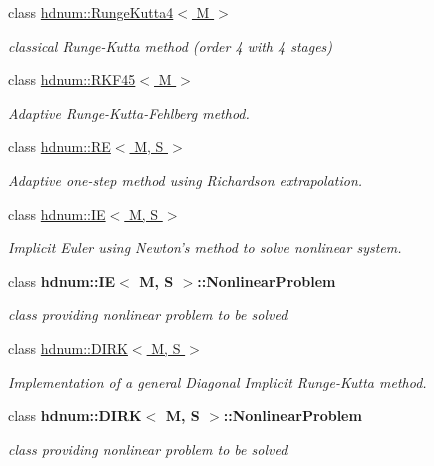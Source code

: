\begin{DoxyCompactItemize}
class \hyperlink{classhdnum_1_1RungeKutta4}{hdnum::RungeKutta4$<$ M $>$}
\begin{DoxyCompactList}\small\item\em classical Runge-\/Kutta method (order 4 with 4 stages) \item\end{DoxyCompactList}\item 
class \hyperlink{classhdnum_1_1RKF45}{hdnum::RKF45$<$ M $>$}
\begin{DoxyCompactList}\small\item\em Adaptive Runge-\/Kutta-\/Fehlberg method. \item\end{DoxyCompactList}\item 
class \hyperlink{classhdnum_1_1RE}{hdnum::RE$<$ M, S $>$}
\begin{DoxyCompactList}\small\item\em Adaptive one-\/step method using Richardson extrapolation. \item\end{DoxyCompactList}\item 
class \hyperlink{classhdnum_1_1IE}{hdnum::IE$<$ M, S $>$}
\begin{DoxyCompactList}\small\item\em Implicit Euler using Newton's method to solve nonlinear system. \item\end{DoxyCompactList}\item 
class {\bfseries hdnum::IE$<$ M, S $>$::NonlinearProblem}
\begin{DoxyCompactList}\small\item\em class providing nonlinear problem to be solved \item\end{DoxyCompactList}\item 
class \hyperlink{classhdnum_1_1DIRK}{hdnum::DIRK$<$ M, S $>$}
\begin{DoxyCompactList}\small\item\em Implementation of a general Diagonal Implicit Runge-\/Kutta method. \item\end{DoxyCompactList}\item 
class {\bfseries hdnum::DIRK$<$ M, S $>$::NonlinearProblem}
\begin{DoxyCompactList}\small\item\em class providing nonlinear problem to be solved \item\end{DoxyCompactList}\end{DoxyCompactItemize}
